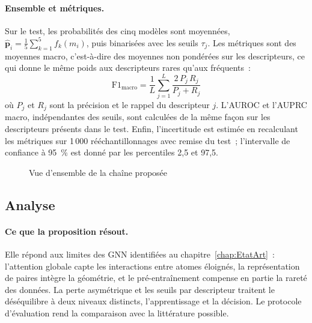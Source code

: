 \paragraph{Ensemble et métriques.}
Sur le test, les probabilités des cinq modèles sont moyennées, $\hat{\mathbf{p}}_i = \frac{1}{5} \sum_{k=1}^{5} f_k(m_i)$, puis binarisées avec les seuils $\tau_j$.
Les métriques sont des moyennes macro, c'est-à-dire des moyennes non pondérées sur les descripteurs, ce qui donne le même poids aux descripteurs rares qu'aux fréquents~:
\begin{equation}
   \label{eq:F1Macro}
   \mathrm{F1}_{\mathrm{macro}} = \frac{1}{L} \sum_{j=1}^{L} \frac{2 \, P_j \, R_j}{P_j + R_j}
\end{equation}
où $P_j$ et $R_j$ sont la précision et le rappel du descripteur $j$.
L'AUROC et l'AUPRC macro, indépendantes des seuils, sont calculées de la même façon sur les descripteurs présents dans le test.
Enfin, l'incertitude est estimée en recalculant les métriques sur 1\,000 rééchantillonnages avec remise du test~; l'intervalle de confiance à 95~\% est donné par les percentiles 2,5 et 97,5.

\begin{figure}
   \centering
   \caption{Vue d'ensemble de la chaîne proposée}
   \label{fig:Pipeline}
\end{figure}

\subsection{Analyse}
\label{sec:AnalyseProposition}

\paragraph{Ce que la proposition résout.}
Elle répond aux limites des GNN identifiées au chapitre~\ref{chap:EtatArt}~: l'attention globale capte les interactions entre atomes éloignés, la représentation de paires intègre la géométrie, et le pré-entraînement compense en partie la rareté des données.
La perte asymétrique et les seuils par descripteur traitent le déséquilibre à deux niveaux distincts, l'apprentissage et la décision.
Le protocole d'évaluation rend la comparaison avec la littérature possible.

